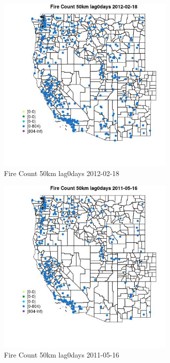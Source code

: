 \begin{figure} 
\centering  
\includegraphics[width=0.77\textwidth]{Code_Outputs/Report_ML_input_PM25_Step4_part_f_de_duplicated_aves_prioritize_24hr_obswNAs_MapObsFire_Count_50km_lag0days2012-02-18.jpg} 
\caption{\label{fig:Report_ML_input_PM25_Step4_part_f_de_duplicated_aves_prioritize_24hr_obswNAsMapObsFire_Count_50km_lag0days2012-02-18}Fire Count 50km lag0days 2012-02-18} 
\end{figure} 
 

\begin{figure} 
\centering  
\includegraphics[width=0.77\textwidth]{Code_Outputs/Report_ML_input_PM25_Step4_part_f_de_duplicated_aves_prioritize_24hr_obswNAs_MapObsFire_Count_50km_lag0days2011-05-16.jpg} 
\caption{\label{fig:Report_ML_input_PM25_Step4_part_f_de_duplicated_aves_prioritize_24hr_obswNAsMapObsFire_Count_50km_lag0days2011-05-16}Fire Count 50km lag0days 2011-05-16} 
\end{figure} 
 

